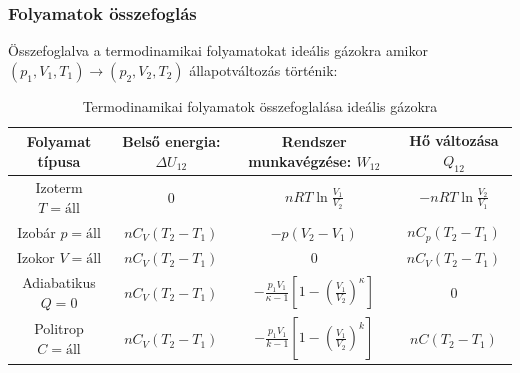 \documentclass[a4paper,12pt]{article}
\begin{document}
\subsubsection*{Folyamatok összefoglás}
Összefoglalva a termodinamikai folyamatokat ideális gázokra amikor $(p_1, V_1, T_1) \to (p_2, V_2, T_2)$ állapotváltozás történik:
\begin{table}[H]
    \centering
    \begin{tabular}{|c|c|c|c|}
        \hline
        Folyamat típusa & Belső energia: $\Delta U_{12}$ & Rendszer munkavégzése: $W_{12}$ & Hő változása $Q_{12}$ \\
        \hline
        Izoterm $T = \text{áll}$ & $0$ & $nRT \ln{\frac{V_1}{V_2}}$ & $- nRT \ln{\frac{V_2}{V_1}}$ \\
        \hline
        Izobár $p = \text{áll}$ & $nC_V (T_2 - T_1)$ & $- p (V_2 - V_1)$ & $n C_p (T_2 - T_1)$ \\
        \hline
        Izokor $V = \text{áll}$ & $nC_V (T_2 - T_1)$ & $0$ & $n C_V (T_2 - T_1)$ \\
        \hline
        Adiabatikus $Q = 0$ & $nC_V (T_2 - T_1)$ & $- \frac{p_1V_1}{\kappa-1}\left[1- (\frac{V_1}{V_2})^\kappa\right]$ & $0$ \\
        \hline
        Politrop $C = \text{áll}$ & $nC_V (T_2 - T_1)$ & $- \frac{p_1V_1}{k-1}\left[1- (\frac{V_1}{V_2})^k\right]$ & $n C (T_2 - T_1)$ \\
        \hline
    \end{tabular}
    \caption{Termodinamikai folyamatok összefoglalása ideális gázokra}
\end{table}
\end{document}
